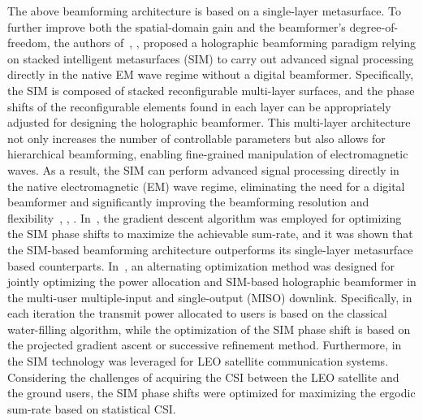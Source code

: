 The above beamforming architecture is based on a single-layer metasurface. To further improve both the spatial-domain gain and the beamformer's degree-of-freedom, the authors of~\cite{an2023stacked}, \cite{an2023stacked_icc}, \cite{lin2024stacked} proposed a holographic beamforming paradigm relying on stacked intelligent metasurfaces (SIM) to carry out advanced signal processing directly in the native EM wave regime without a digital beamformer. Specifically, the SIM is composed of stacked reconfigurable multi-layer surfaces, and the phase shifts of the reconfigurable elements found in each layer can be appropriately adjusted for designing the holographic beamformer. This multi-layer architecture not only increases the number of controllable parameters but also allows for hierarchical beamforming, enabling fine-grained manipulation of electromagnetic waves. As a result, the SIM can perform advanced signal processing directly in the native electromagnetic (EM) wave regime, eliminating the need for a digital beamformer and significantly improving the beamforming resolution and flexibility~\cite{an2023stacked}, \cite{an2023stacked_icc}, \cite{lin2024stacked}. In~\cite{an2023stacked}, the gradient descent algorithm was employed for optimizing the SIM phase shifts to maximize the achievable sum-rate, and it was shown that the SIM-based beamforming architecture outperforms its single-layer metasurface based counterparts. In~\cite{an2023stacked_icc}, an alternating optimization method was designed for jointly optimizing the power allocation and SIM-based holographic beamformer in the multi-user multiple-input and single-output (MISO) downlink. Specifically, in each iteration the transmit power allocated to users is based on the classical water-filling algorithm, while the optimization of the SIM phase shift is based on the projected gradient ascent or successive refinement method. Furthermore, in~\cite{lin2024stacked} the SIM technology was leveraged for LEO satellite communication systems. Considering the challenges of acquiring the CSI between the LEO satellite and the ground users, the SIM phase shifts were optimized for maximizing the ergodic sum-rate based on statistical CSI.